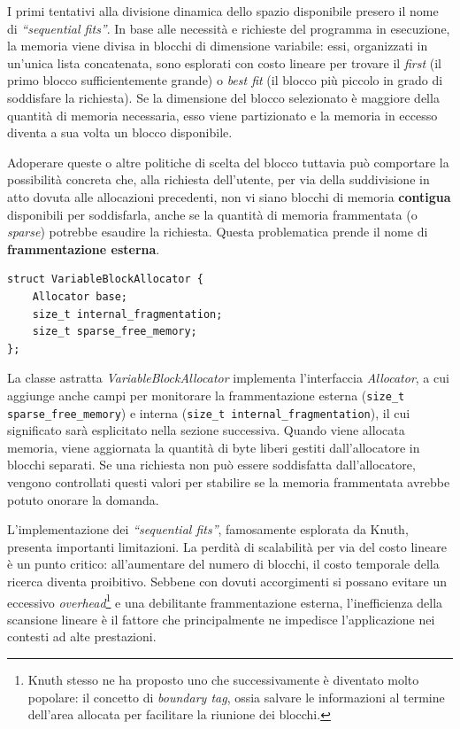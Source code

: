 I primi tentativi alla divisione dinamica dello spazio disponibile presero il nome di \textit{“sequential fits”}. In base alle necessità e richieste del programma in esecuzione, la memoria viene divisa in blocchi di dimensione variabile: essi, organizzati in un'unica lista concatenata, sono esplorati con costo lineare per trovare il \textit{first} (il primo blocco sufficientemente grande) o \textit{best fit} (il blocco più piccolo in grado di soddisfare la richiesta). Se la dimensione del blocco selezionato è maggiore della quantità di memoria necessaria, esso viene partizionato e la memoria in eccesso diventa a sua volta un blocco disponibile. 

Adoperare queste o altre politiche di scelta del blocco tuttavia può comportare la possibilità concreta che, alla richiesta dell'utente, per via della suddivisione in atto dovuta alle allocazioni precedenti, non vi siano blocchi di memoria \textbf{contigua} disponibili per soddisfarla, anche se la quantità di memoria frammentata (o \textit{sparse}) potrebbe esaudire la richiesta. Questa problematica prende il nome di \textbf{frammentazione esterna}.

\begin{lstlisting}
struct VariableBlockAllocator {
    Allocator base;
    size_t internal_fragmentation;
    size_t sparse_free_memory;
};
\end{lstlisting}

La classe astratta \textit{VariableBlockAllocator} implementa l'interfaccia \textit{Allocator}, a cui aggiunge anche campi per monitorare la frammentazione esterna (\lstinline|size_t sparse_free_memory|) e interna (\lstinline[]|size_t internal_fragmentation|), il cui significato sarà esplicitato nella sezione successiva. Quando viene allocata memoria, viene aggiornata la quantità di byte liberi gestiti dall'allocatore in blocchi separati. Se una richiesta non può essere soddisfatta dall'allocatore, vengono controllati questi valori per stabilire se la memoria frammentata avrebbe potuto onorare la domanda.

L'implementazione dei \textit{“sequential fits”}, famosamente esplorata da Knuth, presenta importanti limitazioni. La perdità di scalabilità per via del costo lineare è un punto critico: all’aumentare del numero di blocchi, il costo temporale della ricerca diventa proibitivo. Sebbene con dovuti accorgimenti si possano evitare un eccessivo \textit{overhead}\footnote{Knuth stesso ne ha proposto uno che successivamente è diventato molto popolare: il concetto di \textit{boundary tag}, ossia salvare le informazioni al termine dell'area allocata per facilitare la riunione dei blocchi.} e una debilitante frammentazione esterna, l’inefficienza della scansione lineare è il fattore che principalmente ne impedisce l'applicazione nei contesti ad alte prestazioni.


